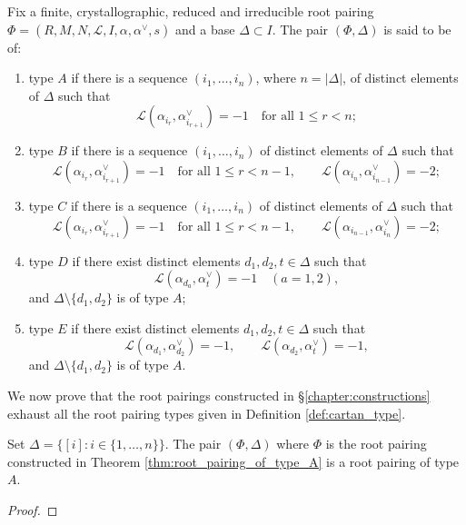 \begin{definition}\label{def:cartan_type}
\leanok
Fix a finite, crystallographic, reduced and irreducible root pairing 
$\Phi=(R,M,N,\mathcal{L},I,\alpha,\alpha^\vee,s)$ and a
base $\Delta\subset I$. The pair $(\Phi,\Delta)$ is said to be of:
\begin{enumerate}
    \item type $A$ if there is a sequence $(i_1,\ldots,i_n)$, where
    $n=|\Delta|$, of distinct elements of $\Delta$ such that
    \[
        \mathcal{L}(\alpha_{i_r},\alpha_{i_{r+1}}^\vee)=-1
        \quad\text{for all }1\le r<n;
    \]
    \item type $B$ if there is a sequence $(i_1,\ldots,i_n)$ of distinct
    elements of $\Delta$ such that
    \[
        \mathcal{L}(\alpha_{i_r},\alpha_{i_{r+1}}^\vee)=-1
        \quad\text{for all }1\le r<n-1,
        \qquad
        \mathcal{L}(\alpha_{i_n},\alpha_{i_{n-1}}^\vee)=-2;
    \]
    \item type $C$ if there is a sequence $(i_1,\ldots,i_n)$ of distinct
    elements of $\Delta$ such that
    \[
        \mathcal{L}(\alpha_{i_r},\alpha_{i_{r+1}}^\vee)=-1
        \quad\text{for all }1\le r<n-1,
        \qquad
        \mathcal{L}(\alpha_{i_{n-1}},\alpha_{i_n}^\vee)=-2;
    \]
    \item type $D$ if there exist distinct elements $d_1,d_2,t\in\Delta$
    such that
    \[
        \mathcal{L}(\alpha_{d_a},\alpha_t^\vee)=-1
        \quad(a=1,2),
    \]
    and $\Delta\setminus\{d_1,d_2\}$ is of type $A$;
    \item type $E$ if there exist distinct elements $d_1,d_2,t\in\Delta$
    such that
    \[
        \mathcal{L}(\alpha_{d_1},\alpha_{d_2}^\vee)=-1,
        \qquad
        \mathcal{L}(\alpha_{d_2},\alpha_t^\vee)=-1,
    \]
    and $\Delta\setminus\{d_1,d_2\}$ is of type $A$.
\end{enumerate}
\end{definition}

We now prove that the root pairings constructed in \S \ref{chapter:constructions} exhaust all the root pairing types 
given in Definition \ref{def:cartan_type}. 

\begin{theorem}
Set $\Delta = \{[i] : i \in \{1,\ldots, n\}\}$. The pair $(\Phi,\Delta)$ where $\Phi$ is 
the root pairing constructed in Theorem \ref{thm:root_pairing_of_type_A} is a root pairing of type $A$.    
\end{theorem}
\begin{proof}
    
\end{proof}